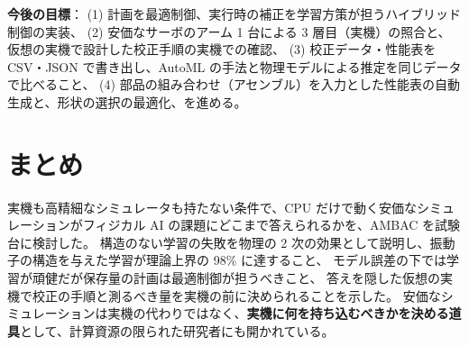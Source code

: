 \documentclass[paper=a4paper,fontsize=10pt,twocolumn,column_gap=2zw,line_length=24zw,number_of_lines=46,head_space=20mm]{jlreq}
\begin{document}
\textbf{今後の目標}：
(1) 計画を最適制御、実行時の補正を学習方策が担うハイブリッド制御の実装、
(2) 安価なサーボのアーム 1 台による 3 層目（実機）の照合と、仮想の実機で設計した校正手順の実機での確認、
(3) 校正データ・性能表を CSV・JSON で書き出し、AutoML の手法と物理モデルによる推定を同じデータで比べること、
(4) 部品の組み合わせ（アセンブル）を入力とした性能表の自動生成と、形状の選択の最適化、を進める。

\section{まとめ}

実機も高精細なシミュレータも持たない条件で、CPU だけで動く安価なシミュレーションがフィジカル AI の課題にどこまで答えられるかを、AMBAC を試験台に検討した。
構造のない学習の失敗を物理の 2 次の効果として説明し、振動子の構造を与えた学習が理論上界の 98\% に達すること、
モデル誤差の下では学習が頑健だが保存量の計画は最適制御が担うべきこと、
答えを隠した仮想の実機で校正の手順と測るべき量を実機の前に決められることを示した。
安価なシミュレーションは実機の代わりではなく、\textbf{実機に何を持ち込むべきかを決める道具}として、計算資源の限られた研究者にも開かれている。
\end{document}
